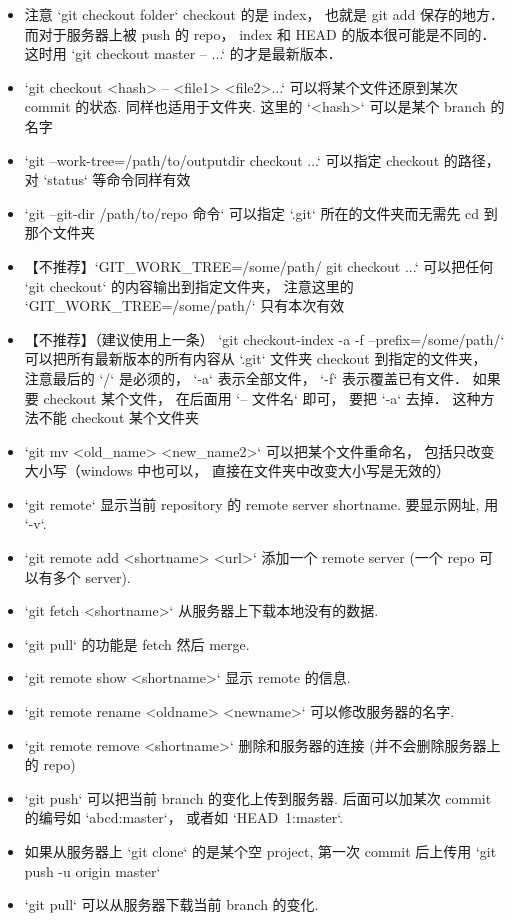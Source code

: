 \begin{itemize}
\item 注意 `git checkout folder` checkout 的是 index， 也就是 git add 保存的地方． 而对于服务器上被 push 的 repo， index 和 HEAD 的版本很可能是不同的． 这时用 `git checkout master -- ...` 的才是最新版本．
\item `git checkout <hash> -- <file1> <file2>...` 可以将某个文件还原到某次 commit 的状态. 同样也适用于文件夹. 这里的 `<hash>` 可以是某个 branch 的名字
\item `git --work-tree=/path/to/outputdir checkout ...` 可以指定 checkout 的路径， 对 `status` 等命令同样有效
\item `git --git-dir /path/to/repo 命令` 可以指定 `.git` 所在的文件夹而无需先 cd 到那个文件夹
\item 【不推荐】`GIT_WORK_TREE=/some/path/ git checkout ...` 可以把任何 `git checkout` 的内容输出到指定文件夹， 注意这里的 `GIT_WORK_TREE=/some/path/` 只有本次有效
\item 【不推荐】（建议使用上一条） `git checkout-index -a -f --prefix=/some/path/` 可以把所有最新版本的所有内容从 `.git` 文件夹 checkout 到指定的文件夹， 注意最后的 `/` 是必须的， `-a` 表示全部文件， `-f` 表示覆盖已有文件． 如果要 checkout 某个文件， 在后面用 `-- 文件名` 即可， 要把 `-a` 去掉． 这种方法不能 checkout 某个文件夹
\item `git mv <old_name> <new_name2>` 可以把某个文件重命名， 包括只改变大小写（windows 中也可以， 直接在文件夹中改变大小写是无效的）
\item `git remote` 显示当前 repository 的 remote server shortname. 要显示网址, 用 `-v`.
\item `git remote add <shortname> <url>` 添加一个 remote server (一个 repo 可以有多个 server).
\item `git fetch <shortname>` 从服务器上下载本地没有的数据.
\item `git pull` 的功能是 fetch 然后 merge.
\item `git remote show <shortname>` 显示 remote 的信息.
\item `git remote rename <oldname> <newname>` 可以修改服务器的名字.
\item `git remote remove <shortname>` 删除和服务器的连接 (并不会删除服务器上的 repo)
\item `git push` 可以把当前 branch 的变化上传到服务器. 后面可以加某次 commit 的编号如 `abcd:master`， 或者如 `HEAD~1:master`.
\item 如果从服务器上 `git clone` 的是某个空 project, 第一次 commit 后上传用 `git push -u origin master`
\item `git pull` 可以从服务器下载当前 branch 的变化.

\end{itemize}
